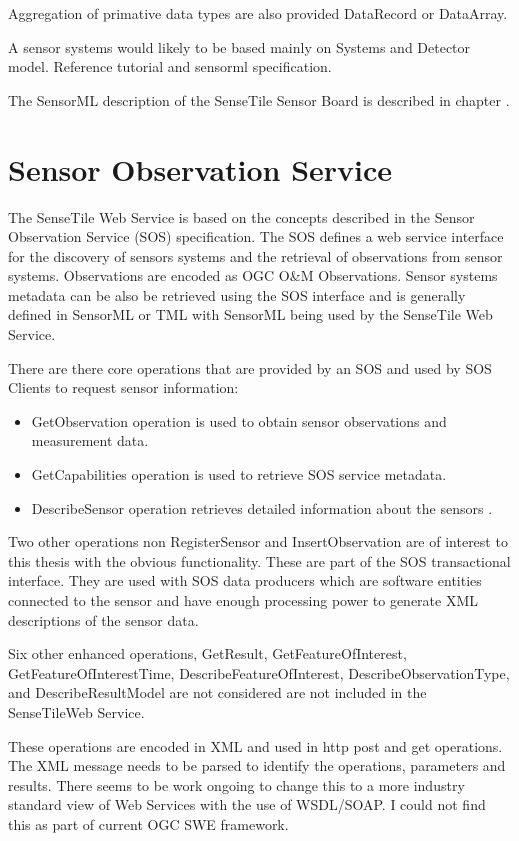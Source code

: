 \documentclass[]{final_report}
\begin{document}
Aggregation of primative data types are also provided DataRecord or DataArray.

A sensor systems would likely to be based mainly on Systems and
Detector model. Reference tutorial and sensorml specification.

The SensorML description of the SenseTile Sensor Board is described in chapter .

\section{Sensor Observation Service}
The SenseTile Web Service is based on the concepts described in the Sensor Observation Service (SOS) specification. The SOS defines a web service interface for the discovery of sensors systems and the retrieval of observations from sensor systems.  Observations are encoded as OGC O\&M Observations. Sensor systems metadata can be also be retrieved using the SOS interface and is generally defined in SensorML or TML with SensorML being used by the SenseTile Web Service.

There are there core operations that are provided by an SOS and used by SOS Clients to request sensor information:
 \begin{itemize}
\item GetObservation operation is used to obtain sensor observations and measurement data.
\item GetCapabilities operation is used to retrieve SOS service metadata.
\item DescribeSensor operation retrieves detailed information about the sensors .
\end{itemize}

Two other operations non RegisterSensor and InsertObservation are of interest to this thesis
with the obvious functionality. These are part of the SOS transactional interface. They are used with SOS data producers which are software entities connected to the sensor and have enough processing power to generate XML descriptions of the sensor data.

Six other enhanced operations, GetResult,
GetFeatureOfInterest, GetFeatureOfInterestTime, DescribeFeatureOfInterest,
DescribeObservationType, and DescribeResultModel are not considered are not included in the SenseTileWeb Service.

These operations are encoded in XML and used in http post and get operations. The XML message needs to be parsed to identify the operations, parameters and results. There seems to be work ongoing to change this to a more industry standard view of Web Services with the use of WSDL/SOAP. I could not find this as part of current OGC SWE framework.
\end{document}
